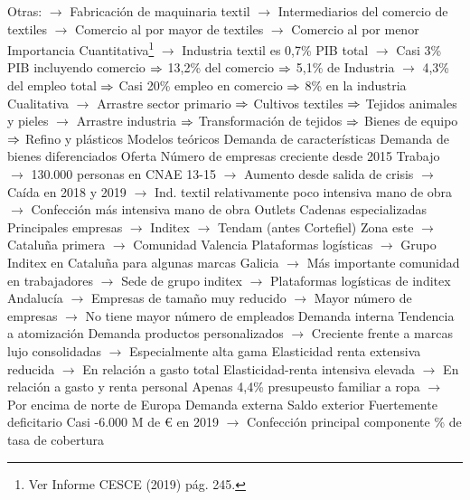 \documentclass{nuevotema}
\begin{document}
\begin{esquemal}
				\4[] Otras:
				\4[] $\to$ Fabricación de maquinaria textil
				\4[] $\to$ Intermediarios del comercio de textiles
				\4[] $\to$ Comercio al por mayor de textiles
				\4[] $\to$ Comercio al por menor
				\4 Importancia
				\4[] Cuantitativa\footnote{Ver Informe CESCE (2019) pág. 245.}
				\4[] $\to$ Industria textil es 0,7\% PIB total
				\4[] $\to$ Casi 3\% PIB incluyendo comercio
				\4[] $\Rightarrow$ 13,2\% del comercio
				\4[] $\Rightarrow$ 5,1\% de Industria
				\4[] $\to$ 4,3\% del empleo total
				\4[] $\Rightarrow$ Casi 20\% empleo en comercio
				\4[] $\Rightarrow$ 8\% en la industria
				\4[] Cualitativa
				\4[] $\to$ Arrastre sector primario
				\4[] $\Rightarrow$ Cultivos textiles
				\4[] $\Rightarrow$ Tejidos animales y pieles
				\4[] $\to$ Arrastre industria
				\4[] $\Rightarrow$ Transformación de tejidos
				\4[] $\Rightarrow$ Bienes de equipo
				\4[] $\Rightarrow$ Refino y plásticos
				\4 Modelos teóricos
				\4[] Demanda de características
				\4[] Demanda de bienes diferenciados
				\4 Oferta
				\4[] Número de empresas creciente desde 2015
				\4[] Trabajo
				\4[] $\to$ 130.000 personas en CNAE 13-15
				\4[] $\to$ Aumento desde salida de crisis
				\4[] $\to$ Caída en 2018 y 2019
				\4[] $\to$ Ind. textil relativamente poco intensiva mano de obra
				\4[] $\to$ Confección más intensiva mano de obra
				\4[] Outlets
				\4[] Cadenas especializadas
				\4[] Principales empresas
				\4[] $\to$ Inditex
				\4[] $\to$ Tendam (antes Cortefiel)
				\4[] Zona este
				\4[] $\to$ Cataluña primera
				\4[] $\to$ Comunidad Valencia
				\4[] Plataformas logísticas
				\4[] $\to$ Grupo Inditex en Cataluña para algunas marcas
				\4[] Galicia
				\4[] $\to$ Más importante comunidad en trabajadores
				\4[] $\to$ Sede de grupo inditex
				\4[] $\to$ Plataformas logísticas de inditex
				\4[] Andalucía
				\4[] $\to$ Empresas de tamaño muy reducido
				\4[] $\to$ Mayor número de empresas
				\4[] $\to$ No tiene mayor número de empleados
				\4 Demanda interna
				\4[] Tendencia a atomización
				\4[] Demanda productos personalizados
				\4[] $\to$ Creciente frente a marcas lujo consolidadas
				\4[] $\to$ Especialmente alta gama
				\4[] Elasticidad renta extensiva reducida
				\4[] $\to$ En relación a gasto total
				\4[] Elasticidad-renta intensiva elevada
				\4[] $\to$ En relación a gasto y renta personal
				\4[] Apenas 4,4\% presupeusto familiar a ropa
				\4[] $\to$ Por encima de norte de Europa
				\4 Demanda externa
				\4 Saldo exterior
				\4[] Fuertemente deficitario
				\4[] Casi -6.000 M de € en 2019
				\4[] $\to$ Confección principal componente
				\% de tasa de cobertura

\end{esquemal}
\end{document}
